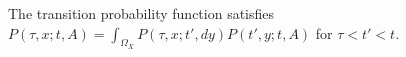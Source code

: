 The transition probability function satisfies $P(\tau, x; t, A) = \int_{\Omega_X} P(\tau, x; t', dy) P(t', y; t, A)$ for $\tau < t' < t$.
